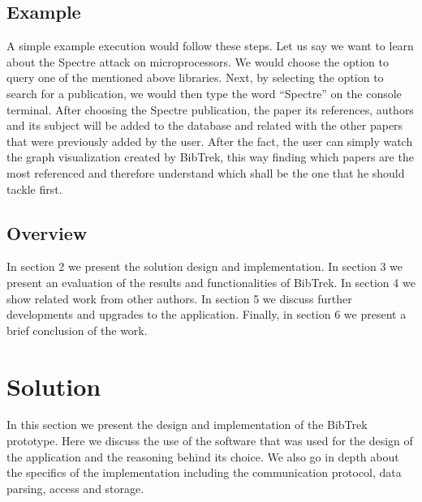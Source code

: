 \documentclass[twocolumn]{article}
\begin{document}
\subsection{Example}
A simple example execution would follow these steps. Let us say we want to learn about the Spectre attack on microprocessors. We would choose the option to query one of the mentioned above libraries. Next, by selecting the option to search for a publication, we would then type the word ``Spectre'' on the console terminal. After choosing the Spectre publication, the paper its references, authors and its subject will be added to the database and related with the other papers that were previously added by the user. After the fact, the user can simply watch the graph visualization created by BibTrek, this way finding which papers are the most referenced and therefore understand which shall be the one that he should tackle first.


\subsection{Overview}
In section 2 we present the solution design and implementation. In section 3 we present an evaluation of the results and functionalities of BibTrek. In section 4 we show related work from other authors. In section 5 we discuss further developments and upgrades to the application. Finally, in section 6 we present a brief conclusion of the work. \\[1\baselineskip]


\section{Solution}

In this section we present the design and implementation of the BibTrek prototype. Here we discuss the use of the software that was used for the design of the application and the reasoning behind its choice. We also go in depth about the specifics of the implementation including the communication protocol, data parsing, access and storage.
\end{document}
